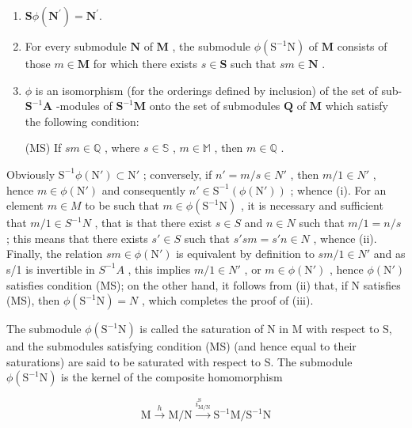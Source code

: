 \begin{enumerate}
\def\labelenumi{(\roman{enumi})}
\item
  \(\mathbf{S}\phi(\mathbf{N}^{\prime}) = \mathbf{N}^{\prime}.\)
\item
  For every submodule \(\mathbf{N}\) of \(\mathbf{M}\) , the submodule \(\phi (\mathrm{S}^{-1}\mathrm{N})\) of \(\mathbf{M}\) consists of those \(m\in \mathbf{M}\) for which there exists \(s\in \mathbf{S}\) such that \(sm\in \mathbf{N}\) .
\item
  \(\phi\) is an isomorphism (for the orderings defined by inclusion) of the set of sub- \(\mathbf{S}^{-1}\mathbf{A}\) -modules of \(\mathbf{S}^{-1}\mathbf{M}\) onto the set of submodules \(\mathbf{Q}\) of \(\mathbf{M}\) which satisfy the following condition:

(MS) If \(sm \in \mathbb{Q}\) , where \(s \in \mathbb{S}\) , \(m \in \mathbb{M}\) , then \(m \in \mathbb{Q}\) .

\end{enumerate}
Obviously \(\mathrm{S}^{-1}\phi(\mathrm{N}')\subset\mathrm{N}'\) ; conversely, if \(n' = m/s \in N'\) , then \(m/1 \in N'\) , hence \(m \in \phi(\mathrm{N}')\) and consequently \(n' \in \mathrm{S}^{-1}(\phi(\mathrm{N'}))\) ; whence (i). For an element \(m \in M\) to be such that \(m \in \phi(\mathrm{S}^{-1}\mathrm{N})\) , it is necessary and sufficient that \(m/1 \in S^{-1}N\) , that is that there exist \(s \in S\) and \(n \in N\) such that \(m/1 = n/s\) ; this means that there exists \(s' \in S\) such that \(s'sm = s'n \in N\) , whence (ii). Finally, the relation \(sm \in \phi(\mathrm{N}')\) is equivalent by definition to \(sm/1 \in N'\) and as s/1 is invertible in \(S^{-1}A\) , this implies \(m/1 \in N'\) , or \(m \in \phi(\mathrm{N}')\) , hence \(\phi(\mathrm{N}')\) satisfies condition (MS); on the other hand, it follows from (ii) that, if N satisfies (MS), then \(\phi(\mathrm{S}^{-1}\mathrm{N}) = N\) , which completes the proof of (iii).

The submodule \(\phi(\mathrm{S}^{-1}\mathrm{N})\) is called the saturation of N in M with respect to S, and the submodules satisfying condition (MS) (and hence equal to their saturations) are said to be saturated with respect to S. The submodule \(\phi(\mathrm{S}^{-1}\mathrm{N})\) is the kernel of the composite homomorphism

\[
\mathrm{M} \xrightarrow {h} \mathrm{M} / \mathrm{N} \xrightarrow {i _ {\mathrm{M} / \mathrm{N}} ^ {\mathrm{S}}} \mathrm{S} ^ {- 1} \mathrm{M} / \mathrm{S} ^ {- 1} \mathrm{N}
\]

